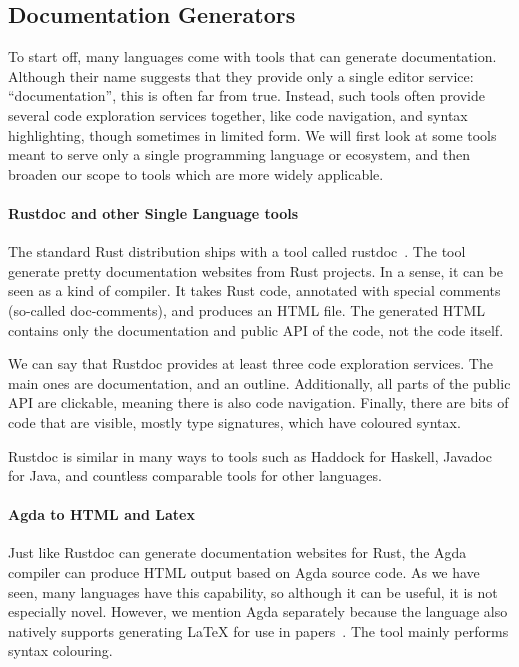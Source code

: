 \subsection{Documentation Generators}

To start off, many languages come with tools that can generate documentation.
Although their name suggests that they provide only a single editor service: ``documentation'', this is often far from true.
Instead, such tools often provide several code exploration services together, like code navigation, and syntax highlighting, though sometimes in limited form.
We will first look at some tools meant to serve only a single programming language or ecosystem, and then broaden our scope
to tools which are more widely applicable.

\paragraph{Rustdoc and other Single Language tools}

The standard Rust distribution ships with a tool called rustdoc~\autocite{rustdoc}.
The tool generate pretty documentation websites from Rust projects.
In a sense, it can be seen as a kind of compiler.
It takes Rust code, annotated with special comments (so-called doc-comments), and produces an HTML file.
The generated HTML contains only the documentation and public API of the code, not the code itself.

We can say that Rustdoc provides at least three code exploration services.
The main ones are documentation, and an outline.
Additionally, all parts of the public API are clickable, meaning there is also code navigation.
Finally, there are bits of code that are visible, mostly type signatures, which have coloured syntax.

Rustdoc is similar in many ways to tools such as Haddock for Haskell, Javadoc for Java, and countless comparable tools for other languages.

\paragraph{Agda to HTML and Latex}

Just like Rustdoc can generate documentation websites for Rust, the Agda compiler can produce HTML output based on Agda source code.
As we have seen, many languages have this capability, so although it can be useful, it is not especially novel.
However, we mention Agda separately because the language also natively supports generating LaTeX for use in papers~\autocite{agda_latex}.
The tool mainly performs syntax colouring.

